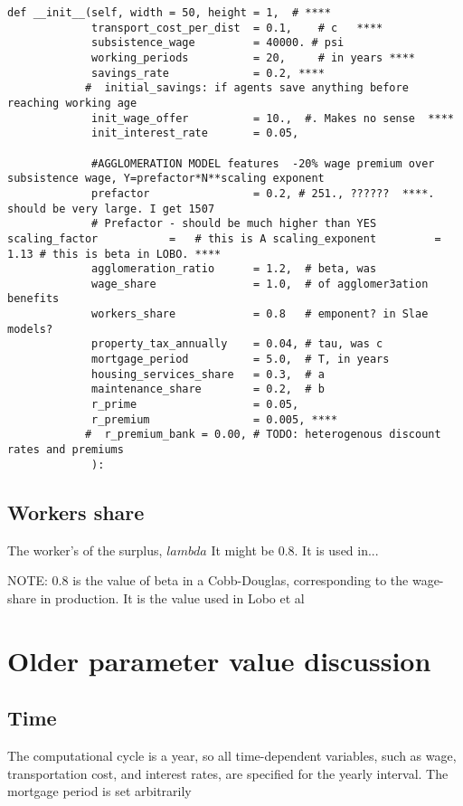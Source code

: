 \begin{lstlisting}
def __init__(self, width = 50, height = 1,  # ****
             transport_cost_per_dist  = 0.1,    # c   ****
             subsistence_wage         = 40000. # psi
             working_periods          = 20,     # in years ****
             savings_rate             = 0.2, ****
            #  initial_savings: if agents save anything before reaching working age
             init_wage_offer          = 10.,  #. Makes no sense  ****
             init_interest_rate       = 0.05,

             #AGGLOMERATION MODEL features  -20% wage premium over subsistence wage, Y=prefactor*N**scaling exponent
             prefactor                = 0.2, # 251., ??????  ****. should be very large. I get 1507 
             # Prefactor - should be much higher than YES scaling_factor           =   # this is A scaling_exponent         =  1.13 # this is beta in LOBO. ****
             agglomeration_ratio      = 1.2,  # beta, was 
             wage_share               = 1.0,  # of agglomer3ation benefits
             workers_share            = 0.8   # emponent? in Slae models?
             property_tax_annually    = 0.04, # tau, was c
             mortgage_period          = 5.0,  # T, in years
             housing_services_share   = 0.3,  # a
             maintenance_share        = 0.2,  # b
             r_prime                  = 0.05,
             r_premium                = 0.005, ****
            #  r_premium_bank = 0.00, # TODO: heterogenous discount rates and premiums
             ):
\end{lstlisting}

\subsection{Workers share}
The worker's of the surplus, $lambda$ It might be 0.8. It is used in...

NOTE: 0.8 is the value of beta in a Cobb-Douglas, corresponding to the wage-share in production. It is the value used in Lobo et al


\section{Older parameter value discussion}

\subsection{Time}
 The computational cycle is a year, so all time-dependent variables, such as wage, transportation cost, and interest rates, are specified for the yearly interval. The mortgage period is set arbitrarily 
 
